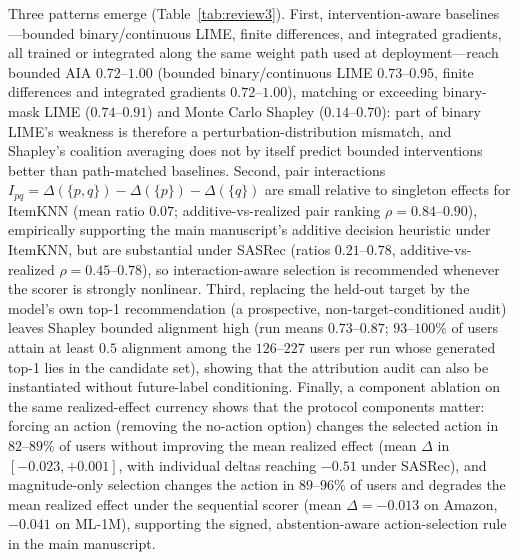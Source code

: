 \documentclass[manuscript,screen,anonymous]{acmart}
\begin{document}
Three patterns emerge (Table~\ref{tab:review3}). First, intervention-aware baselines---bounded binary/continuous LIME, finite differences, and integrated gradients, all trained or integrated along the same weight path used at deployment---reach bounded AIA $0.72$--$1.00$ (bounded binary/continuous LIME $0.73$--$0.95$, finite differences and integrated gradients $0.72$--$1.00$), matching or exceeding binary-mask LIME ($0.74$--$0.91$) and Monte Carlo Shapley ($0.14$--$0.70$): part of binary LIME's weakness is therefore a perturbation-distribution mismatch, and Shapley's coalition averaging does not by itself predict bounded interventions better than path-matched baselines. Second, pair interactions $I_{pq}=\Delta(\{p,q\})-\Delta(\{p\})-\Delta(\{q\})$ are small relative to singleton effects for ItemKNN (mean ratio $0.07$; additive-vs-realized pair ranking $\rho=0.84$--$0.90$), empirically supporting the main manuscript's additive decision heuristic under ItemKNN, but are substantial under SASRec (ratios $0.21$--$0.78$, additive-vs-realized $\rho=0.45$--$0.78$), so interaction-aware selection is recommended whenever the scorer is strongly nonlinear. Third, replacing the held-out target by the model's own top-1 recommendation (a prospective, non-target-conditioned audit) leaves Shapley bounded alignment high (run means $0.73$--$0.87$; $93$--$100\%$ of users attain at least $0.5$ alignment among the $126$--$227$ users per run whose generated top-1 lies in the candidate set), showing that the attribution audit can also be instantiated without future-label conditioning. Finally, a component ablation on the same realized-effect currency shows that the protocol components matter: forcing an action (removing the no-action option) changes the selected action in $82$--$89\%$ of users without improving the mean realized effect (mean $\Delta$ in $[-0.023,+0.001]$, with individual deltas reaching $-0.51$ under SASRec), and magnitude-only selection changes the action in $89$--$96\%$ of users and degrades the mean realized effect under the sequential scorer (mean $\Delta=-0.013$ on Amazon, $-0.041$ on ML-1M), supporting the signed, abstention-aware action-selection rule in the main manuscript.
\end{document}
